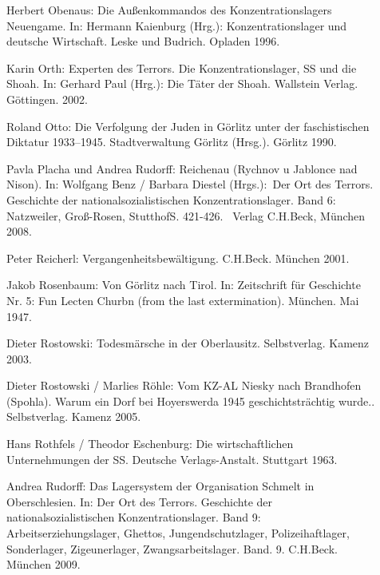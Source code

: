 \documentclass[a4paper,12pt,ngerman,
]{nisebook}
\begin{document}
\begin{description}
\item[]{Herbert Obenaus: \glqq Die Außenkommandos des Konzentrationslagers Neuengame\grqq. In: Hermann Kaienburg (Hrg.): \glqq Konzentrationslager und deutsche Wirtschaft\grqq. Leske und Budrich. Opladen 1996.}

\item[]{Karin Orth: \glqq Experten des Terrors. Die Konzentrationslager, SS und die Shoah\grqq. In: Gerhard Paul (Hrg.): \glqq Die Täter der Shoah\grqq. Wallstein Verlag. Göttingen. 2002.}

\item[]{Roland Otto: \glqq Die Verfolgung der Juden in Görlitz unter der faschistischen Diktatur 1933--1945\grqq. Stadtverwaltung Görlitz (Hrsg.). Görlitz 1990.}

\item[]{Pavla Placha und Andrea Rudorff: \glqq Reichenau (Rychnov u Jablonce nad Nison)\grqq. In: Wolf­gang Benz / Bar­bara Die­s­tel (Hrgs.): \glqq Der Ort des Terrors. Geschichte der nationalsozialistischen Konzentrationslager. Band 6: Natzweiler, Groß-Rosen, Stutthof\grqq S. 421-426.  Ver­lag C.H.Beck, Mün­chen 2008.}

\item[]{Peter Reicherl: \glqq Vergangenheitsbewältigung\grqq. C.H.Beck. München 2001.}

\item[]{Jakob Rosenbaum: \glqq Von Görlitz nach Tirol\grqq. In: \glqq Zeitschrift für Geschichte Nr. 5\grqq: Fun Lecten Churbn (from the last extermination). München. Mai 1947.}	

\item[]{Dieter Rostowski: \glqq Todesmärsche in der Oberlausitz\grqq. Selbstverlag. Kamenz 2003. }

\item[]{Dieter Rostowski / Marlies Röhle: \glqq Vom KZ-AL Niesky nach Brandhofen (Spohla). Warum ein Dorf bei Hoyerswerda 1945 geschichtsträchtig wurde.\grqq. Selbstverlag. Kamenz 2005.}

\item[]{Hans Rothfels / Theodor Eschenburg: \glqq Die wirtschaftlichen Unternehmungen der SS\grqq. Deutsche Verlags-Anstalt. Stuttgart 1963. }

\item[]{Andrea Rudorff: \glqq Das Lagersystem der Organisation Schmelt in Oberschlesien\grqq. In: \glqq Der Ort des Terrors. Geschichte der nationalsozialistischen Konzentrationslager. Band 9: Arbeitserziehungslager, Ghettos, Jungendschutzlager, Polizeihaftlager, Sonderlager, Zigeunerlager, Zwangsarbeitslager\grqq. Band. 9. C.H.Beck. München 2009. }


\end{description}
\end{document}
